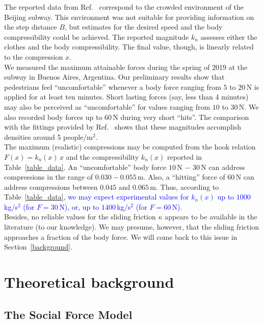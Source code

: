 \documentclass[preprint,12pt]{elsarticle}
\begin{document}
The reported data from Ref.~\cite{song_2019} correspond to the crowded 
environment of the Beijing subway. This environment was not suitable for 
providing information on the step distance $B$, but estimates for the 
desired speed and the body compressibility could be achieved. The reported 
magnitude $k_n$ assesses either the clothes and the body compressibility. The 
final value, though, is linearly related to the compression $x$. \\

We measured the maximum attainable forces during the spring of 2019 at the subway in Buenos Aires, 
Argentina. Our preliminary results show that pedestrians feel ``uncomfortable'' 
whenever a body force ranging from $5$ to $20\,$N is applied for at least ten 
minutes. Short lasting forces (say, less than 4 minutes) may also be perceived 
as ``uncomfortable'' for values ranging from $10$ to $30\,$N. We also recorded body 
forces up to $60\,$N during very short ``hits''. The comparison with the 
fittings provided by Ref.~\cite{song_2019} shows that these magnitudes 
accomplish densities around 5 people/m$^2$.     \\    

The maximum (realistic) compressions may be computed from the hook relation 
$F(x)=k_n(x)\,x$ and the compressibility $k_n(x)$ reported in Table~\ref{table_data}. 
An ``uncomfortable'' body force  $10\,$N $-$ $30\,$N can address compressions in the 
range of $0.030-0.055\,$m. Also, a ``hitting'' force of $60\,$N can address 
compressions between $0.045$ and $0.065\,$m. Thus, according to 
Table~\ref{table_data}, \textcolor{blue}{we may expect experimental values for $k_n(x)$ up to 
$1000\,$kg/s$^2$ (for $F=30\,$N), or, up to $1400\,$kg/s$^2$ (for $F=60\,$N).} \\

Besides, no reliable values for the sliding friction $\kappa$ appears to be 
available in the literature (to our knowledge). We may presume, however, that 
the sliding friction approaches a fraction of the body force. We will come back 
to this issue in Section~\ref{background}. \\


\section{\label{background}Theoretical background}

\subsection{\label{sfm}The Social Force Model}
\end{document}
